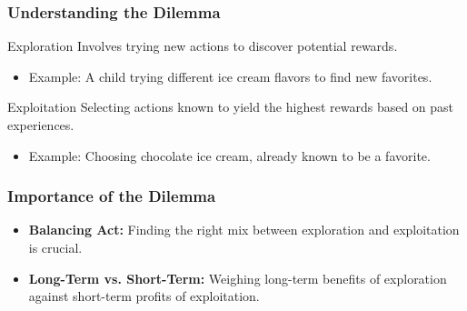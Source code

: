 \documentclass{beamer}
\begin{document}
\begin{frame}[fragile]
    \frametitle{Understanding the Dilemma}
    \begin{block}{Exploration}
        Involves trying new actions to discover potential rewards.
        \begin{itemize}
            \item Example: A child trying different ice cream flavors to find new favorites.
        \end{itemize}
    \end{block}
    
    \begin{block}{Exploitation}
        Selecting actions known to yield the highest rewards based on past experiences.
        \begin{itemize}
            \item Example: Choosing chocolate ice cream, already known to be a favorite.
        \end{itemize}
    \end{block}
\end{frame}

\begin{frame}[fragile]
    \frametitle{Importance of the Dilemma}
    \begin{itemize}
        \item \textbf{Balancing Act:} Finding the right mix between exploration and exploitation is crucial. 
        \item \textbf{Long-Term vs. Short-Term:} Weighing long-term benefits of exploration against short-term profits of exploitation.
    \end{itemize}
\end{frame}
\end{document}
